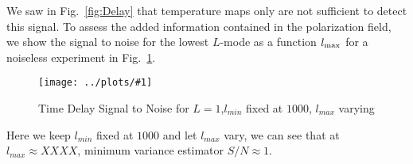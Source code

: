 \documentclass[prl,amsmath,amssymb,floatfix,superscriptaddress,nofootinbib,twocolumn]{revtex4-1}
\newcommand{\sfig}[2]{
\texttt{[image: ../plots/\#1]}
        }
\newcommand{\Spng}[2]{
   \begin{figure}[thbp]
   \begin{center}
    \sfig{#1.png}{\columnwidth}
    \caption{{\small #2}}
    \label{fig:#1}
     \end{center}
   \end{figure}
}
\newcommand{\rf}[1]{\ref{fig:#1}}
\begin{document}
We saw in Fig.~\rf{Delay} that temperature maps only are not sufficient to detect this signal. To assess the added information contained in the polarization field, we show the signal to noise for the lowest $L$-mode as a function $l_{\rm max}$ for a noiseless experiment in Fig.~\rf{StoN}.
\Spng{StoN}{Time Delay Signal to Noise for $L=1$,$l_{min}$ fixed at $1000$, $l_{max}$ varying}
Here we keep $l_{min}$ fixed at $1000$ and let $l_{max}$ vary, we can see that at $l_{max} \approx XXXX$, minimum variance estimator $S/N \approx 1$. 

\appendix
\end{document}
